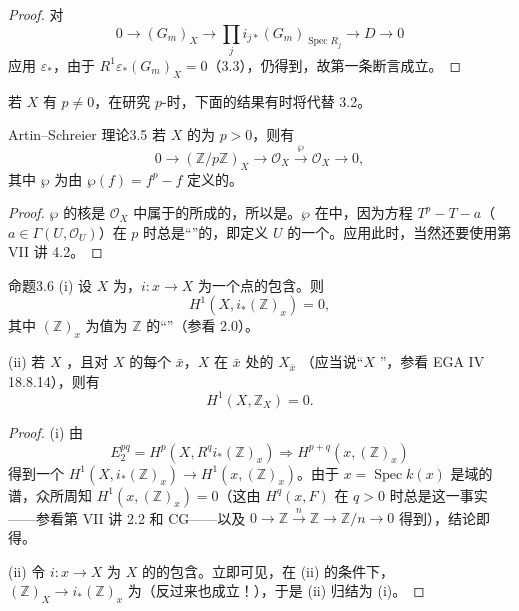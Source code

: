 \begin{proof}
对
\[
0\longrightarrow(G_m)_X\longrightarrow\prod_ji_{j*}(G_m)_{\operatorname{Spec}R_j}\longrightarrow D\longrightarrow0
\]
应用 $\varepsilon_*$，由于 $R^1\varepsilon_*(G_m)_X=0$（3.3），仍得到，故第一条断言成立。
\end{proof}
若 $X$ 有 $p\ne0$，在研究 $p$-时，下面的结果有时将代替 3.2。
\begin{SGAresult}{Artin--Schreier 理论}{3.5}
若 $X$ 的为 $p>0$，则有
\[
0\longrightarrow(\mathbb Z/p\mathbb Z)_X\longrightarrow\mathcal O_X\xrightarrow{\wp}\mathcal O_X\longrightarrow0,
\]
其中 $\wp$ 为由 $\wp(f)=f^p-f$ 定义的。
\end{SGAresult}
\begin{proof}
$\wp$ 的核是 $\mathcal O_X$ 中属于的所成的，所以是。$\wp$ 在中，因为方程 $T^p-T-a$（$a\in\Gamma(U,\mathcal O_U)$）在 $p$ 时总是“”的，即定义 $U$ 的一个。应用此时，当然还要使用第 VII 讲 4.2。
\end{proof}
\begin{SGAresult}{命题}{3.6}
(i) 设 $X$ 为，$i:x\to X$ 为一个点的包含。则
\[
H^1(X,i_*(\mathbb Z)_x)=0,
\]
其中 $(\mathbb Z)_x$ 为值为 $\mathbb Z$ 的“”（参看 2.0）。

(ii) 若 $X$ ，且对 $X$ 的每个 $\bar x$，$X$ 在 $\bar x$ 处的 $X_{\bar x}$ （应当说“$X$ ”，参看 EGA IV 18.8.14），则有
\[
H^1(X,\mathbb Z_X)=0.
\]
\end{SGAresult}
\begin{proof}
(i) 由 
\[
E_2^{pq}=H^p(X,R^qi_*(\mathbb Z)_x)\Longrightarrow H^{p+q}(x,(\mathbb Z)_x)
\]
得到一个 $H^1(X,i_*(\mathbb Z)_x)\to H^1(x,(\mathbb Z)_x)$。由于 $x=\operatorname{Spec}k(x)$ 是域的谱，众所周知 $H^1(x,(\mathbb Z)_x)=0$（这由 $H^q(x,F)$ 在 $q>0$ 时总是这一事实——参看第 VII 讲 2.2 和 CG——以及 $0\to\mathbb Z\xrightarrow{n}\mathbb Z\to\mathbb Z/n\to0$ 得到），结论即得。

(ii) 令 $i:x\to X$ 为 $X$ 的的包含。立即可见，在 (ii) 的条件下， $(\mathbb Z)_X\to i_*(\mathbb Z)_x$ 为（反过来也成立！），于是 (ii) 归结为 (i)。
\end{proof}
